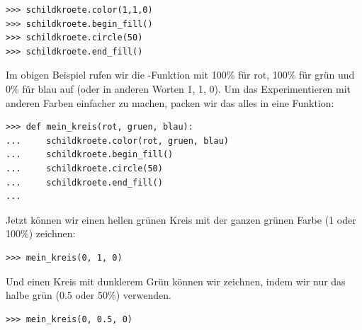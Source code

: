 \begin{Verbatim}[frame=single]
>>> schildkroete.color(1,1,0)
>>> schildkroete.begin_fill()
>>> schildkroete.circle(50)
>>> schildkroete.end_fill()
\end{Verbatim}

Im obigen Beispiel rufen wir die -Funktion mit 100\% für rot, 100\% für grün und 0\% für blau auf (oder in anderen Worten 1, 1, 0). Um das Experimentieren mit anderen Farben einfacher zu machen, packen wir das alles in eine Funktion:

\begin{Verbatim}[frame=single]
>>> def mein_kreis(rot, gruen, blau):
...     schildkroete.color(rot, gruen, blau)
...     schildkroete.begin_fill()
...     schildkroete.circle(50)
...     schildkroete.end_fill()
...
\end{Verbatim}

\noindent
Jetzt können wir einen hellen grünen Kreis mit der ganzen grünen Farbe (1 oder 100\%) zeichnen:

\begin{Verbatim}[frame=single]
>>> mein_kreis(0, 1, 0)
\end{Verbatim}

\noindent
Und einen Kreis mit dunklerem Grün können wir zeichnen, indem wir nur das halbe grün (0.5 oder 50\%) verwenden.

\begin{Verbatim}[frame=single]
>>> mein_kreis(0, 0.5, 0)
\end{Verbatim}

